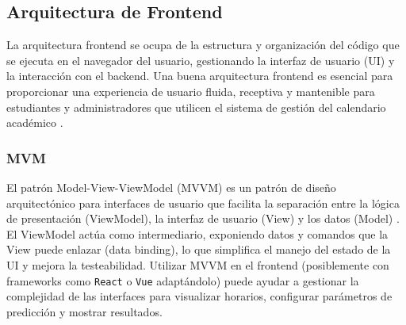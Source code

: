 \subsection{Arquitectura de Frontend}
La arquitectura frontend se ocupa de la estructura y organización del código que se ejecuta en el navegador del usuario, gestionando la interfaz de usuario (UI) y la interacción con el backend.
Una buena arquitectura frontend es esencial para proporcionar una experiencia de usuario fluida, receptiva y mantenible para estudiantes y administradores que utilicen el sistema de gestión del calendario académico \parencite{Osmani2017}.

\subsubsection{MVM}
El patrón Model-View-ViewModel (MVVM) es un patrón de diseño arquitectónico para interfaces de usuario que facilita la separación entre la lógica de presentación (ViewModel), la interfaz de usuario (View) y los datos (Model) \parencite{Smith2005}.
El ViewModel actúa como intermediario, exponiendo datos y comandos que la View puede enlazar (data binding), lo que simplifica el manejo del estado de la UI y mejora la testeabilidad.
Utilizar MVVM en el frontend (posiblemente con frameworks como \texttt{React} o \texttt{Vue} adaptándolo) puede ayudar a gestionar la complejidad de las interfaces para visualizar horarios, configurar parámetros de predicción y mostrar resultados.
